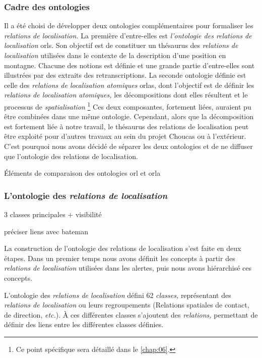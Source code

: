 \subsubsection{Cadre des ontologies}

Il a été choisi de développer deux ontologies complémentaires pour
formaliser les \emph{relations de localisation.} La première
d'entre-elles est \emph{l'ontologie des relations de localisation}
\acp{orl}. Son objectif est de constituer un thésaurus des
\emph{relations de localisation} utilisées dans le contexte de la
description d'une position en montagne. Chacune des notions est
définie et une grande partie d'entre-elles sont illustrées par des
extraits des retranscriptions. La seconde ontologie définie est celle
des \emph{relations de localisation atomiques} \acp{orla}, dont
l'objectif est de définir les \emph{relations de localisation
  atomiques,} les décompositions dont elles résultent et le processus
de \emph{spatialisation} \footnote{Ce point spécifique sera détaillé
  dans le \autoref{chap:06}.} Ces deux composantes, fortement liées,
auraient pu être combinées dans une même ontologie. Cependant, alors
que la décomposition est fortement liée à notre travail, le thésaurus
des relations de localisation peut être exploité pour d'autres travaux
au sein du projet Choucas ou à l'extérieur. C'est pourquoi nous avons
décidé de séparer les deux ontologies et de ne diffuser que
l'ontologie des relations de localisation.

\begin{table}
  \centering
  
  \caption{Éléments de comparaison des ontologies \ac{orl} et
    \ac{orla}}
  \label{tab:orl_vs_orla}
\end{table}

\subsubsection{L'ontologie des \emph{relations de localisation}}

3 classes principales + visibilité

préciser liens avec bateman

La construction de l'ontologie des relations de localisation s'est
faite en deux étapes. Dans un premier temps nous avons définit les
concepts à partir des \emph{relations de localisation} utilisées dans
les alertes, puis nous avons hiérarchisé ces concepts.


L'ontologie des \emph{relations de localisation} défini 62
\emph{classes,} représentant des \emph{relations de localisation} ou
leurs regroupements (\eg Relations spatiales de contact, de direction,
\emph{etc.}). À ces différentes classes s'ajoutent des
\emph{relations,} permettant de définir des liens entre les
différentes classes définies.

